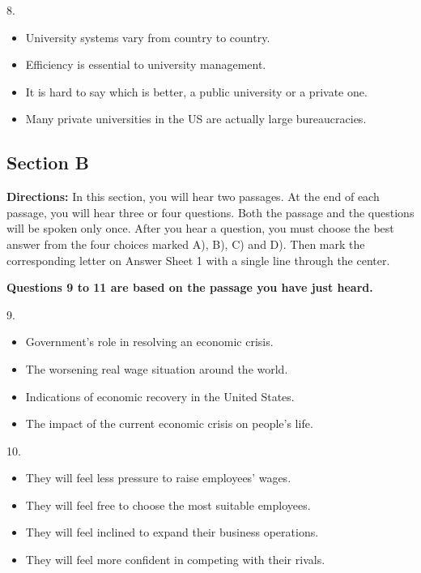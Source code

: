 \documentclass[UTF8,11pt]{ctexart}
\begin{document}
8.


\begin{itemize}[leftmargin=2em,itemsep=.2em,topsep=.4em]\item[A.] University systems vary from country to country.
\item[B.] Efficiency is essential to university management.
\item[C.] It is hard to say which is better, a public university or a private one.
\item[D.] Many private universities in the US are actually large bureaucracies.
\end{itemize}

\subsection*{\textbf{Section B}}


\textbf{Directions:} In this section, you will hear two passages. At the end of each passage, you will hear three or four questions. Both the passage and the questions will be spoken only once. After you hear a question, you must choose the best answer from the four choices marked A), B), C) and D). Then mark the corresponding letter on Answer Sheet 1 with a single line through the center.


\textbf{Questions 9 to 11 are based on the passage you have just heard.}


9.


\begin{itemize}[leftmargin=2em,itemsep=.2em,topsep=.4em]\item[A.] Government’s role in resolving an economic crisis.
\item[B.] The worsening real wage situation around the world.
\item[C.] Indications of economic recovery in the United States.
\end{itemize}

\begin{itemize}[leftmargin=2em,itemsep=.2em,topsep=.4em]\item[D.] The impact of the current economic crisis on people’s life.
\end{itemize}

10.


\begin{itemize}[leftmargin=2em,itemsep=.2em,topsep=.4em]\item[A.] They will feel less pressure to raise employees’ wages.
\item[B.] They will feel free to choose the most suitable employees.
\item[C.] They will feel inclined to expand their business operations.
\item[D.] They will feel more confident in competing with their rivals.
\end{itemize}
\end{document}
